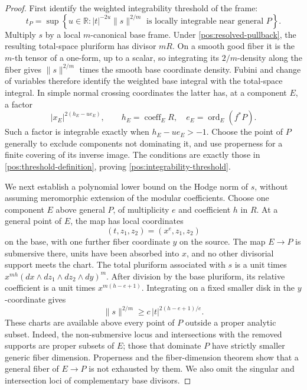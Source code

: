 \documentclass[11pt,letterpaper]{article}
\theoremstyle{definition}
\theoremstyle{remark}
\begin{document}
\begin{proof}
First identify the weighted integrability threshold of the frame:
\begin{equation}\label{pos:integrability-threshold}
 t_P=\sup\left\{u\in\mathbb{R}:
 |t|^{-2u}\|s\|^{2/m}\text{ is locally integrable near general }P
 \right\}.
\end{equation}
Multiply \(s\) by a local \(m\)-canonical base frame. Under
\eqref{pos:resolved-pullback}, the resulting total-space
pluriform has divisor \(mR\). On a smooth good fiber it is the
\(m\)-th tensor of a one-form, up to a scalar, so integrating its
\(2/m\)-density along the fiber gives \(\|s\|^{2/m}\) times the
smooth base coordinate density. Fubini and change of variables
therefore identify the weighted base integral with the total-space
integral. In simple normal crossing coordinates the latter has, at
a component \(E\), a factor
\[
 |x_E|^{2(h_E-u e_E)},\qquad
 h_E=\operatorname{coeff}_E R,\quad e_E=\operatorname{ord}_E(f^*P).
\]
Such a factor is integrable exactly when \(h_E-u e_E>-1\).
Choose the point of \(P\) generally to exclude components not
dominating it, and use properness for a finite covering of its inverse
image. The conditions are exactly those in
\eqref{pos:threshold-definition}, proving
\eqref{pos:integrability-threshold}.

We next establish a polynomial lower bound on the Hodge norm of
\(s\), without assuming meromorphic extension of the modular
coefficients. Choose one component \(E\) above general \(P\), of
multiplicity \(e\) and coefficient \(h\) in \(R\). At a general
point of \(E\), the map has local coordinates
\[
 (t,z_1,z_2)=(x^e,z_1,z_2)
\]
on the base, with one further fiber coordinate \(y\) on the source.
The map \(E\to P\) is submersive there, units have been absorbed
into \(x\), and no other divisorial support meets the chart. The
total pluriform associated with \(s\) is a unit times
\(x^{mh}(dx\wedge dz_1\wedge dz_2\wedge dy)^m\).
After division by the base pluriform, its relative coefficient is
a unit times \(x^{m(h-e+1)}\). Integrating on a fixed smaller disk
in the \(y\)-coordinate gives
\begin{equation}\label{pos:polynomial-lower-bound}
 \|s\|^{2/m}\geq c\,|t|^{2(h-e+1)/e}.
\end{equation}
These charts are available above every point of \(P\) outside a
proper analytic subset. Indeed, the non-submersive locus and
intersections with the removed supports are proper subsets of \(E\);
those that dominate \(P\) have strictly smaller generic fiber
dimension. Properness and the fiber-dimension theorem show that a
general fiber of \(E\to P\) is not exhausted by them. We also omit
the singular and intersection loci of complementary base divisors.


\end{proof}
\end{document}
